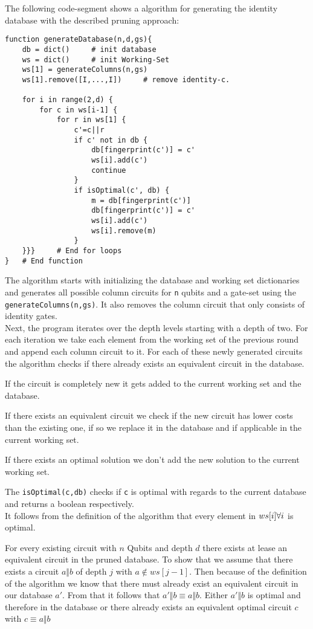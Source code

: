The following code-segment shows a algorithm for generating the identity database with the described pruning approach:
\begin{verbatim}
function generateDatabase(n,d,gs){
	db = dict() 	# init database
	ws = dict() 	# init Working-Set
	ws[1] = generateColumns(n,gs)
	ws[1].remove([I,...,I]) 	# remove identity-c.
	
	for i in range(2,d) {
		for c in ws[i-1] {
			for r in ws[1] {
				c'=c||r
				if c' not in db {
					db[fingerprint(c')] = c'
					ws[i].add(c')
					continue
				}
				if isOptimal(c', db) {
					m = db[fingerprint(c')]
					db[fingerprint(c')] = c'	
					ws[i].add(c')
					ws[i].remove(m)
				}
	}}} 	# End for loops
} 	# End function
\end{verbatim}

The algorithm starts with initializing the database and working set dictionaries and generates all possible column circuits for \texttt{n} qubits and a gate-set using the \texttt{generateColumns(n,gs)}. It also removes the column circuit that only consists of identity gates.\\

Next, the program iterates over the depth levels starting with a depth of two. For each iteration we take each element from the working set of the previous round and append each column circuit to it. For each of these newly generated circuits the algorithm checks if there already exists an equivalent circuit in the database. 

If the circuit is completely new it gets added to the current working set and the database. 

If there exists an equivalent circuit we check if the new circuit has lower costs than the existing one, if so we replace it in the database and if applicable in the current working set. 

If there exists an optimal solution we don't add the new solution to the current working set.

The \texttt{isOptimal(c,db)} checks if \texttt{c} is optimal with regards to the current database  and returns a boolean respectively.\\

It follows from the definition of the algorithm that every element in $ws[i]\space\forall i$ is optimal. 

For every existing circuit with $n$ Qubits and depth $d$ there exists at lease an equivalent circuit in the pruned database. To show that we assume that there exists a circuit $a\Vert b$ of depth $j$ with $a\not\in ws[j-1]$. Then because of the definition of the algorithm we know that there must already exist an equivalent circuit in our database $a'$. From that it follows that $a'\Vert b\equiv a\Vert b$. Either $a'\Vert b$ is optimal and therefore in the database or there already exists an equivalent optimal circuit $c$ with $c\equiv a\Vert b$

